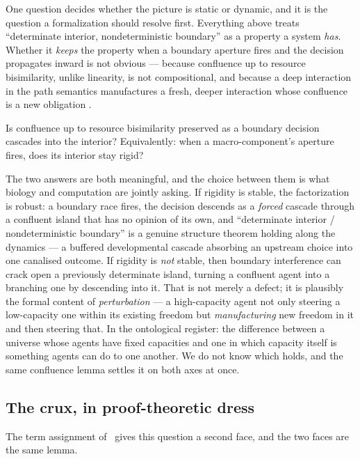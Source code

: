 One question decides whether the picture is static or dynamic, and it is the question a
formalization should resolve first. Everything above treats ``determinate interior,
nondeterministic boundary'' as a property a system \emph{has}. Whether it \emph{keeps}
the property when a boundary aperture fires and the decision propagates inward is not
obvious --- because confluence up to resource bisimilarity, unlike linearity, is not
compositional, and because a deep interaction in the path semantics manufactures a fresh,
deeper interaction whose confluence is a new obligation \cite{paths}.

\begin{question}\label{ndo:q:crux}
Is confluence up to resource bisimilarity preserved as a boundary decision cascades into
the interior? Equivalently: when a macro-component's aperture fires, does its interior
stay rigid?
\end{question}

\noindent
The two answers are both meaningful, and the choice between them is what biology and
computation are jointly asking. If rigidity is stable, the factorization is robust: a
boundary race fires, the decision descends as a \emph{forced} cascade through a confluent
island that has no opinion of its own, and ``determinate interior / nondeterministic
boundary'' is a genuine structure theorem holding along the dynamics --- a buffered
developmental cascade absorbing an upstream choice into one canalised outcome. If rigidity
is \emph{not} stable, then boundary interference can crack open a previously determinate
island, turning a confluent agent into a branching one by descending into it. That is not
merely a defect;
it is plausibly the formal content of \emph{perturbation} --- a high-capacity agent not
only steering a low-capacity one within its existing freedom but \emph{manufacturing} new
freedom in it and then steering that. In the ontological register: the difference between a
universe whose agents have fixed capacities and one in which capacity itself is something
agents can do to one another. We do not know which holds, and the same confluence lemma
settles it on both axes at once.


\subsection{The crux, in proof-theoretic dress}

The term assignment of \chChs\ gives this question a second face, and the two faces
are the same lemma.

